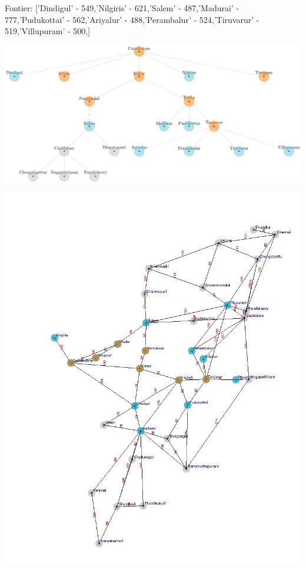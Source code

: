 \documentclass[xcolor=table]{beamer}
\begin{document}
\begin{frame}
  { \tiny Fontier: ['Dindigul' - 549,'Nilgiris' - 621,'Salem' - 487,'Madurai' - 777,'Pudukottai' - 562,'Ariyalur' - 488,'Perambalur' - 524,'Tiruvarur' - 519,'Villupuram' - 500,]}
  \begin{center}
  \includegraphics[height=0.35\textheight]{../AStarNode/9-1.png}
  \end{center}
  \begin{center}
    \includegraphics[height=0.55\textheight]{../AStaroutput/tamilAStar7.jpg}
  \end{center}
\end{frame}
\end{document}
